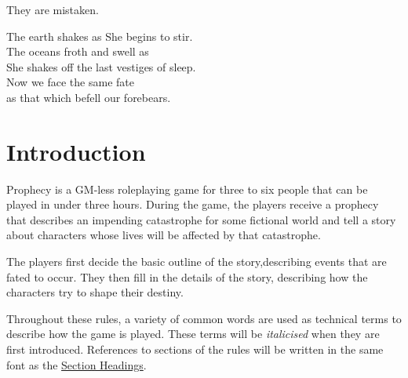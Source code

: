 \documentclass[12pt, a5paper, parskip=half-]{scrartcl}
\begin{document}
\medskip

They are mistaken. 

\medskip

The earth shakes as She begins to stir.\\
The oceans froth and swell as\\She shakes off the last vestiges of sleep.\\
Now we face the same fate\\as that which befell our forebears.
\vfill

\newpage


\raggedright
\section*{Introduction} \label{section:introduction}
Prophecy is a GM-less roleplaying game for three to six people that can be played in under three hours.
During the game, the players receive a prophecy that describes an impending catastrophe for some fictional world and tell a story about characters whose lives will be affected by that catastrophe. 

The players first decide the basic outline of the story,describing events that are fated to occur.  They then fill in the details of the story, describing how the characters try to shape their destiny.

Throughout these rules, a variety of common words are used as technical terms to describe how the game is played.
These terms will be \emph{italicised} when they are first introduced.
References to sections of the rules will be written in the same font as the \hyperref[section:introduction]{\cinzel \small Section Headings}.
\end{document}
